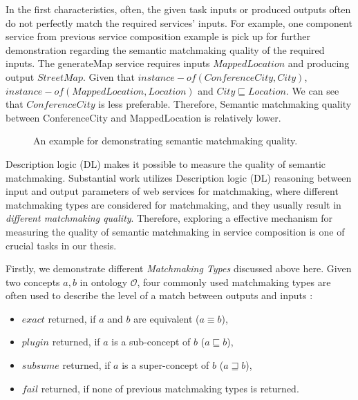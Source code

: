 In the first characteristics, often, the given task inputs or produced outputs often do not perfectly match the required services' inputs. For example, one component service from previous service composition example is pick up for further demonstration regarding the semantic matchmaking quality of the required inputs. The generateMap service requires inputs $MappedLocation$ and producing output $StreetMap$. Given that $instance-of (ConferenceCity,City)$, $instance-of (MappedLocation, Location)$ and $City \sqsubseteq Location$. We can see that $ConferenceCity$ is less preferable. Therefore, Semantic matchmaking quality between ConferenceCity and  MappedLocation is relatively lower. 

\begin{figure}
\centerline{
}
\caption{An example for demonstrating semantic matchmaking quality.}
\label{fig:sm_example}
\end{figure}

Description logic (DL) makes it possible to measure the quality of semantic matchmaking. Substantial work \cite{bansal2016generalized,lecue2009optimizing, lecue2007making, lecue2006formal, rao2005semantic} utilizes Description logic (DL) reasoning between input and output parameters of web services for matchmaking, where different matchmaking types are considered for matchmaking, and they usually result in \emph{different matchmaking quality}. Therefore, exploring a effective mechanism for measuring the quality of semantic matchmaking in service composition is one of crucial tasks in our thesis. 

Firstly, we demonstrate different \emph{Matchmaking Types} discussed above here. Given two concepts $a, b$ in ontology $\mathcal{O}$, four commonly used matchmaking types are often used to describe the level of a match between outputs and inputs \cite{paolucci2002semantic}: 
\begin{itemize}
\item $exact$ returned, if $a$ and $b$ are equivalent ($a \equiv b$), 
\item $plugin$ returned, if $a$ is a sub-concept of $b$ ($a \sqsubseteq b$),
\item $subsume$ returned, if $a$ is a super-concept of $b$ ($a \sqsupseteq b$), 
\item $fail$ returned, if none of previous matchmaking types is returned. 
\end{itemize}

